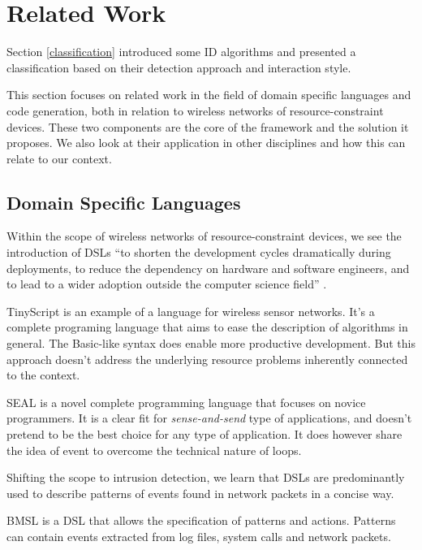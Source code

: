 \documentclass[conference]{IEEEtran}
\begin{document}
\section{Related Work}
\label{related}

Section \ref{classification} introduced some ID algorithms
\cite{ganeriwal2008reputation,mishra2004intrusion,krontiris2009cooperative} and
presented a classification
\cite{mishra2004intrusion,ioannis2007towards,alrajeh2013intrusion} based on
their detection approach and interaction style.

This section focuses on related work in the field of domain specific languages
and code generation, both in relation to wireless networks of
resource-constraint devices. These two components are the core of the \NAME
framework and the solution it proposes. We also look at their application in
other disciplines and how this can relate to our context.

\subsection{Domain Specific Languages}

Within the scope of wireless networks of resource-constraint devices, we see
the introduction of DSLs \enquote{to shorten the development cycles
dramatically during deployments, to reduce the dependency on hardware and
software engineers, and to lead to a wider adoption outside the computer
science field} \cite{sadilek2008domain}.

TinyScript \cite{levis2004tinyscript} is an example of a language for wireless
sensor networks. It's a complete programing language that aims to ease the
description of algorithms in general. The Basic-like syntax does enable more
productive development. But this approach doesn't address the underlying
resource problems inherently connected to the context.

SEAL \cite{elsts2013seal} is a novel complete programming language that focuses
on novice programmers. It is a clear fit for \emph{sense-and-send} type of
applications, and doesn't pretend to be the best choice for any type of
application. It does however share the idea of event to overcome the technical
nature of loops.

Shifting the scope to intrusion detection, we learn that DSLs are predominantly
used to describe patterns of events found in network
packets \cite{sekar1999high,roesch1999snort} in a concise way.

BMSL \cite{uppuluri2001experiences} is a DSL that allows the specification of
patterns and actions. Patterns can contain events extracted from log files,
system calls and network packets.
\end{document}
